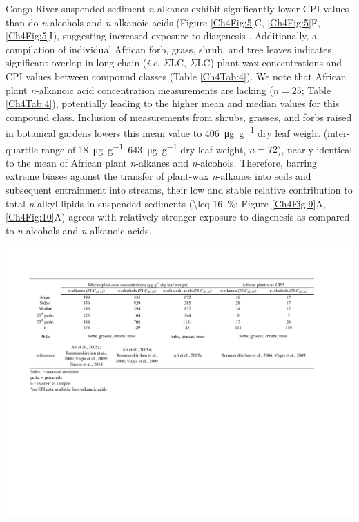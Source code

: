 Congo River suspended sediment \textit{n}-alkanes exhibit significantly lower CPI values than do \textit{n}-alcohols and \textit{n}-alkanoic acids (Figure \ref{Ch4Fig:5}C, \ref{Ch4Fig:5}F, \ref{Ch4Fig:5}I), suggesting increased exposure to diagenesis \citep{Meyers:1993vwa}. Additionally, a compilation of individual African forb, grass, shrub, and tree leaves indicates significant overlap in long-chain (\textit{i.e.} $\Sigma$LC, $\Sigma$LC) plant-wax concentrations and CPI values between compound classes (Table \ref{Ch4Tab:4}). We note that African plant \textit{n}-alkanoic acid concentration measurements are lacking ($n = 25$; Table \ref{Ch4Tab:4}), potentially leading to the higher mean and median values for this compound class. Inclusion of measurements from shrubs, grasses, and forbs raised in botanical gardens \citep{Gao:2014bk} lowers this mean value to \SI{406}{\micro g.g^{-1}} dry leaf weight (inter-quartile range of \SIrange{18}{643}{\micro g.g^{-1}} dry leaf weight, $n = 72$), nearly identical to the mean of African plant \textit{n}-alkanes and \textit{n}-alcohols. Therefore, barring extreme biases against the transfer of plant-wax \textit{n}-alkanes into soils and subsequent entrainment into streams, their low and stable relative contribution to total \textit{n}-alkyl lipids in suspended sediments (\SI{\leq 16}{\%}; Figure \ref{Ch4Fig:9}A, \ref{Ch4Fig:10}A) agrees with relatively stronger exposure to diagenesis as compared to \textit{n}-alcohols and \textit{n}-alkanoic acids.

\begin{table}
	\caption[Leaf lipid distributions and concentrations from African plants]{Summary statistics of plant-wax \textit{n}-alkane, \textit{n}-alcohol, and \textit{n}-alkanoic acid ($\Sigma$LC, $\Sigma$LC) concentration and CPI data from African plant leaves (\si{\micro g.g^{-1}} dry leaf weight).}
	\centering
		\includegraphics{Thesis_Tables/Ch4Tab4}
	\label{Ch4Tab:4} 
\end{table}


